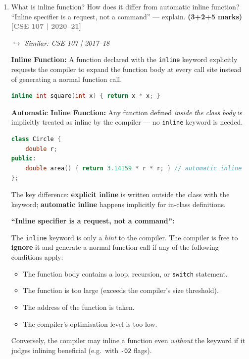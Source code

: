 \documentclass[12pt,a3paper]{article}
\newcommand{\yr}[1]{\hfill\textcolor{gray}{\small\textbf{[#1]}}}
\newcommand{\mk}[1]{\textcolor{orange!70!black}{\small\textbf{(#1 marks)}}}
\newcommand{\variant}[1]{\par\vspace{1pt}\textcolor{blue!50!black}%
  {\footnotesize\textit{$\hookrightarrow$ Similar: #1}}}
\begin{document}
\begin{enumerate}
\item What is inline function? How does it differ from automatic inline function? ``Inline specifier is a request, not a command'' --- explain. \mk{3+2+5}
\yr{CSE 107 | 2020--21}
\variant{CSE 107 | 2017--18}

\begin{tcolorbox}[enhanced,breakable,ansbox,colback=cC!4,colframe=cC,
  boxrule=0.8pt,arc=5pt,
  title={\textbf{Answer --- Inline function vs automatic inline; request not command}},
  fonttitle=\bfseries\color{white},colbacktitle=cC]

\textbf{Inline Function:}
A function declared with the \texttt{inline} keyword explicitly
requests the compiler to expand the function body at every call site
instead of generating a normal function call.

\begin{lstlisting}[language=C++]
inline int square(int x) { return x * x; }
\end{lstlisting}

\textbf{Automatic Inline Function:}
Any function defined \emph{inside the class body} is implicitly
treated as inline by the compiler --- no \texttt{inline} keyword is
needed.

\begin{lstlisting}[language=C++]
class Circle {
    double r;
public:
    double area() { return 3.14159 * r * r; } // automatic inline
};
\end{lstlisting}

The key difference: \textbf{explicit inline} is written outside the
class with the keyword; \textbf{automatic inline} happens implicitly
for in-class definitions.

\medskip
\textbf{``Inline specifier is a request, not a command'':}

The \texttt{inline} keyword is only a \emph{hint} to the compiler.
The compiler is free to \textbf{ignore} it and generate a normal
function call if any of the following conditions apply:
\begin{itemize}[itemsep=2pt]
  \item The function body contains a loop, recursion, or
    \texttt{switch} statement.
  \item The function is too large (exceeds the compiler's size
    threshold).
  \item The address of the function is taken.
  \item The compiler's optimisation level is too low.
\end{itemize}
Conversely, the compiler may inline a function even \emph{without}
the keyword if it judges inlining beneficial (e.g.\ with
\texttt{-O2} flags).


\end{tcolorbox}
\end{enumerate}
\end{document}
